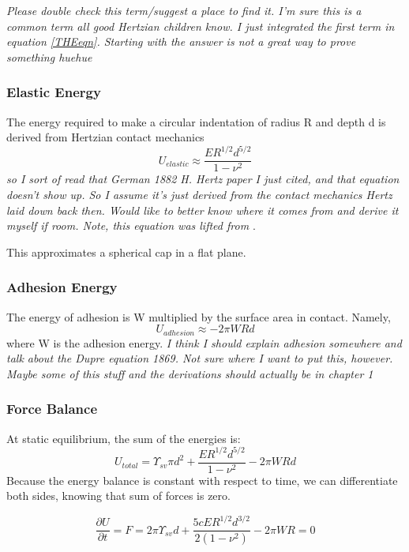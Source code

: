\emph{Please double check this term/suggest a place to find it. I'm sure this is a common term all good Hertzian children know. I just integrated the first term in equation \ref{THEeqn}. Starting with the answer is not a great way to prove something huehue}

\subsubsection{Elastic Energy}
The energy required to make a circular indentation of radius R and depth d is derived from Hertzian contact mechanics \cite{hertz1882uber}
\begin{equation}
\label{elastic_energy}
U_{elastic} \approx  \frac{ER^{1/2}d^{5/2}}{1-\nu^2}
\end{equation}
\emph{so I sort of read that German 1882 H. Hertz paper I just cited, and that equation doesn't show up. So I assume it's just derived from the contact mechanics Hertz laid down back then. Would like to better know where it comes from and derive it myself if room. Note, this equation was lifted from \cite{style2013surface}}.

This approximates a spherical cap in a flat plane.
\subsubsection{Adhesion Energy}
The energy of adhesion is W multiplied by the surface area in contact. Namely,
\begin{equation}
\label{W_energy}
U_{adhesion} \approx -2\pi W R d 
\end{equation}
where W is the adhesion energy. \emph{I think I should explain adhesion somewhere and talk about the Dupre equation 1869. Not sure where I want to put this, however. Maybe some of this stuff and the derivations should actually be in chapter 1}

\subsubsection{Force Balance}
At static equilibrium, the sum of the energies is:
\[U_{total} = \Upsilon_{sv} \pi d^2 + \frac{ER^{1/2}d^{5/2}}{1-\nu^2} - 2\pi W R d\] 
Because the energy balance is constant with respect to time, we can differentiate both sides, knowing that sum of forces is zero.

\begin{equation}
\label{THEeqn}
\frac{\partial U}{\partial t} = F = 2 \pi \Upsilon_{sv}d  + \frac{5cER^{1/2}d^{3/2}}{2 \left( 1-\nu ^2 \right) }  - 2 \pi WR = 0
\end{equation}


